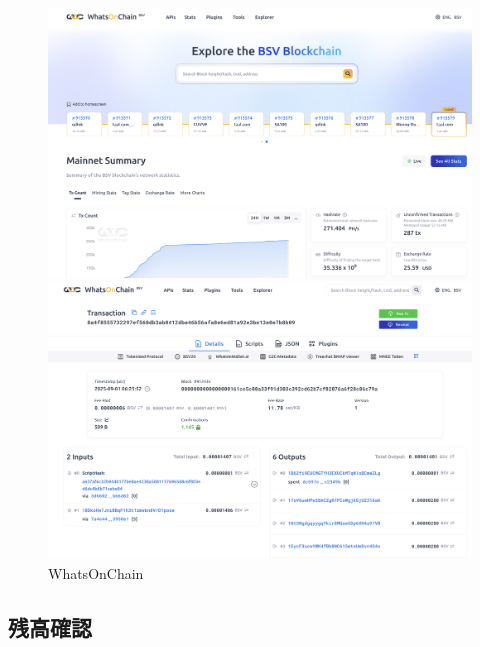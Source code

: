 \documentclass[11pt,a4paper]{ltjsarticle}  %
\begin{document}
\begin{figure}[H]
\centering
\begin{minipage}[t][0.28\textheight][c]{0.48\linewidth}
  \centering
  \includegraphics[width=\linewidth,height=0.28\textheight,keepaspectratio]{fig2.png}
\end{minipage}\hfill
\begin{minipage}[t][0.28\textheight][c]{0.48\linewidth}
  \centering
  \includegraphics[width=\linewidth,height=0.28\textheight,keepaspectratio]{fig3.png}
\end{minipage}

\caption{WhatsOnChain}
\end{figure}



\subsection{残高確認}
\end{document}
